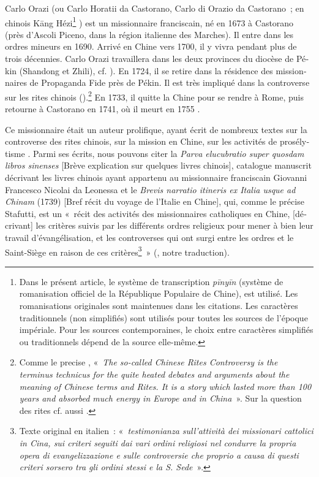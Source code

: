 \documentclass[output=paper,colorlinks,citecolor=brown,arabicfont,chinesefont,booklanguage=french]{langscibook}
\begin{document}
\begin{otherlanguage}{french}
Carlo Orazi (ou Carlo Horatii da Castorano, Carlo di Orazio da Castorano~; en chinois Kāng Hézi\footnote{Dans le présent article, le système de transcription \emph{pīnyīn} (système de romanisation officiel de la République Populaire de Chine), est utilisé. Les romanisations originales sont maintenues dans les citations. Les caractères traditionnels (non simplifiés) sont utilisés pour toutes les sources de l’époque impériale. Pour les sources contemporaines, le choix entre caractères simplifiés ou traditionnels dépend de la source elle-même.} {}) est un missionnaire franciscain, né en 1673 à Castorano (près d’Ascoli Piceno, dans la région italienne des Marches). Il entre dans les ordres mineurs en 1690. Arrivé en Chine vers 1700, il y vivra pendant plus de trois décennies. Carlo Orazi travaillera dans les deux provinces du diocèse de Pékin (Shandong et Zhili), cf. \citealt{Catto2013}). En 1724,  il se retire dans la résidence des missionnaires de Propaganda Fide près de Pékin. Il est très impliqué dans la controverse sur les rites chinois (\citealt{Von_collani2016}).\footnote{Comme le precise \citet[479]{Von_collani2016}, «~\emph{The so-called Chinese Rites Controversy is the terminus technicus for the quite heated debates and arguments about the meaning of Chinese terms and Rites. It is a story which lasted more than 100 years and absorbed much energy in Europe and in China}~». Sur la question des rites cf. aussi \citet{Mungello1994}.} En 1733, il quitte la Chine pour se rendre à Rome, puis retourne à Castorano en 1741, où il meurt en 1755 \citep{Catto2013}.

Ce missionnaire était un auteur prolifique, ayant écrit de nombreux textes sur la controverse des rites chinois, sur la mission en Chine, sur les activités de prosélytisme \citep{Yu2017}. Parmi ses écrits, nous pouvons citer la \emph{Parva elucubratio super quosdam libros sinenses} [Brève explication sur quelques livres chinois], catalogue manuscrit décrivant les livres chinois ayant appartenu au missionnaire franciscain Giovanni Francesco Nicolai da Leonessa et le \emph{Brevis narratio itineris ex Italia usque ad Chinam} (1739) [Bref récit du voyage de l’Italie en Chine], qui, comme le précise Stafutti, est un «~récit des activités des missionnaires catholiques en Chine, [décrivant] les critères suivis par les différents ordres religieux pour mener à bien leur travail d’évangélisation, et les controverses qui ont surgi entre les ordres et le Saint-Siège en raison de ces critères\footnote{Texte original en italien~: «~\emph{testimonianza sull’attività dei missionari cattolici in Cina, sui criteri seguiti dai vari ordini religiosi nel condurre la propria opera di evangelizzazione e sulle controversie che proprio a causa di questi criteri sorsero tra gli ordini stessi e la S. Sede}~».}~» (\citet[35]{Stafutti1981}, notre traduction).


\end{otherlanguage}
\end{document}
